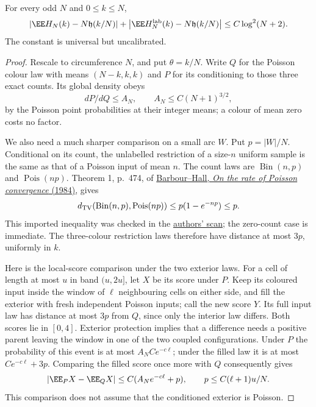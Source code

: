 \documentclass[11pt,letterpaper]{article}
\begin{document}
\begin{theorem}
\label{thm:uniform-history-mean-bias}
For every odd $N$ and $0\le k\le N$,
\begin{equation}\label{eq:uniform-history-mean-bias}
 \left|\EE H_N(k)-N\mathfrak h(k/N)\right|
       +\left|\EE H_N^{\rm lab}(k)-N\mathfrak h(k/N)\right|
                       \le C\log^2(N+2).
\end{equation}
The constant is universal but uncalibrated.
\end{theorem}
\begin{proof}
Rescale to circumference $N$, and put $\theta=k/N$.
Write $Q$ for the Poisson colour law with means
$(N-k,k,k)$ and $P$ for its conditioning to those three
exact counts. Its global density obeys
\[
 dP/dQ\le A_N,\qquad A_N\le C(N+1)^{3/2},
\]
by the Poisson point probabilities at their integer means;
a colour of mean zero costs no factor.

We also need a much sharper comparison on a small arc $W$.
Put $p=|W|/N$. Conditional on its count, the unlabelled
restriction of a size-$n$ uniform sample is the same as that
of a Poisson input of mean $n$. The count laws are
$\operatorname{Bin}(n,p)$ and $\operatorname{Pois}(np)$.
Theorem 1, p.~474, of
\href{https://doi.org/10.1017/S0305004100061806}
{Barbour--Hall, \emph{On the rate of Poisson convergence}
(1984)}, gives
\[
 d_{\rm TV}(\operatorname{Bin}(n,p),\operatorname{Pois}(np))
        \le p(1-e^{-np})\le p.
\]
This imported inequality was checked in the
\href{https://user.math.uzh.ch/barbour/pub/Barbour/BHall_PoissonRate.pdf}
{authors' scan}; the zero-count case is immediate.
The three-colour restriction laws therefore have distance
at most $3p$, uniformly in $k$.

Here is the local-score comparison under the two exterior laws.
For a cell of length at most $u$ in band $(u,2u]$, let $X$
be its score under $P$. Keep its coloured input inside the
window of $\ell$ neighbouring cells on either side, and fill
the exterior with fresh independent Poisson inputs; call
the new score $Y$. Its full input law has distance at most
$3p$ from $Q$, since only the interior law differs.
Both scores lie in $[0,4]$.
Exterior protection implies that a difference needs a
positive parent leaving the window in one of the two
coupled configurations.
Under $P$ the probability of this event is at most
$A_NCe^{-c\ell}$; under the filled law it is at most
$Ce^{-c\ell}+3p$. Comparing the filled score once more
with $Q$ consequently gives
\begin{equation}\label{eq:local-mean-count-comparison}
 |\EE_P X-\EE_Q X|\le C(A_Ne^{-c\ell}+p),
 \qquad p\le C(\ell+1)u/N.
\end{equation}
This comparison does not assume that the conditioned
exterior is Poisson.


\end{proof}
\end{document}
